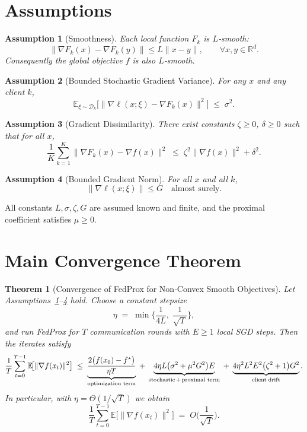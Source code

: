 \documentclass[11pt]{article}
\newtheorem{theorem}{Theorem}
\newtheorem{assumption}{Assumption}
\begin{document}
\section*{Assumptions}
\begin{assumption}[Smoothness]\label{as:smooth}
Each local function $F_k$ is $L$‑smooth:
\[
\|\nabla F_k(x)-\nabla F_k(y)\|\le L\|x-y\|,\qquad\forall x,y\in\mathbb{R}^d.
\]
Consequently the global objective $f$ is also $L$‑smooth.
\end{assumption}

\begin{assumption}[Bounded Stochastic Gradient Variance]\label{as:variance}
For any $x$ and any client $k$,
\[
\mathbb{E}_{\xi\sim\mathcal{D}_k}\!\big[\|\nabla\ell(x;\xi)-\nabla F_k(x)\|^{2}\big]
\;\le\;\sigma^{2}.
\]
\end{assumption}

\begin{assumption}[Gradient Dissimilarity]\label{as:dissimilarity}
There exist constants $\zeta\ge0$, $\delta\ge0$ such that for all $x$,
\[
\frac{1}{K}\sum_{k=1}^{K}\|\nabla F_k(x)-\nabla f(x)\|^{2}
\;\le\;\zeta^{2}\|\nabla f(x)\|^{2}+\delta^{2}.
\]
\end{assumption}

\begin{assumption}[Bounded Gradient Norm]\label{as:bounded}
For all $x$ and all $k$,
\[
\|\nabla\ell(x;\xi)\|\le G\quad\text{almost surely}.
\]
\end{assumption}

All constants $L,\sigma,\zeta,G$ are assumed known and finite, and the
proximal coefficient satisfies $\mu\ge0$.

\section*{Main Convergence Theorem}
\begin{theorem}[Convergence of FedProx for Non‑Convex Smooth Objectives]\label{thm:main}
Let Assumptions~\ref{as:smooth}–\ref{as:bounded} hold.
Choose a constant stepsize
\[
\eta\;=\;\min\Big\{\frac{1}{4L},\;\frac{1}{\sqrt{T}}\Big\},
\]
and run FedProx for $T$ communication rounds with $E\ge1$ local SGD
steps. Then the iterates satisfy
\[
\frac{1}{T}\sum_{t=0}^{T-1}\mathbb{E}\!\big[\|\nabla f(x_t)\|^{2}\big]
\;\le\;
\underbrace{\frac{2\big(f(x_0)-f^{\star}\big)}{\eta T}}_{\text{optimization term}}
\;+\;
\underbrace{4\eta L\big(\sigma^{2}+ \mu^{2}G^{2}\big)E}_{\text{stochastic\,+\,proximal term}}
\;+\;
\underbrace{4\eta^{2}L^{2}E^{2}\big(\zeta^{2}+1\big)G^{2}}_{\text{client\;drift}} .
\]
In particular, with $\eta =\Theta(1/\sqrt{T})$ we obtain
\[
\frac{1}{T}\sum_{t=0}^{T-1}\mathbb{E}\!\big[\|\nabla f(x_t)\|^{2}\big]
\;=\;O\!\Big(\frac{1}{\sqrt{T}}\Big).
\]
\end{theorem}
\end{document}
